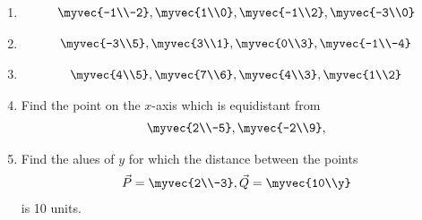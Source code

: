 \begin{enumerate}[label=\arabic*.,ref=\thesubsection.\theenumi]
\begin{enumerate}
\item 
\begin{align}
\myvec{-1\\-2}, \myvec{1\\0},
\myvec{-1\\2}, \myvec{-3\\0}
\end{align}
\item 
\begin{align}
\myvec{-3\\5}, \myvec{3\\1},
\myvec{0\\3}, \myvec{-1\\-4}
\end{align}
\item 
\begin{align}
\myvec{4\\5}, \myvec{7\\6},
\myvec{4\\3}, \myvec{1\\2}
\end{align}
\item Find the point on the $x$-axis which is equidistant from 
\begin{align}
\myvec{2\\-5}, \myvec{-2\\9},
\end{align}
\item Find the alues of $y$ for which the distance between the points 
\begin{align}
\vec{P} = \myvec{2\\-3}, \vec{Q} = \myvec{10\\y}
\end{align}
is 10 units.
\end{enumerate}
\end{enumerate}
%
